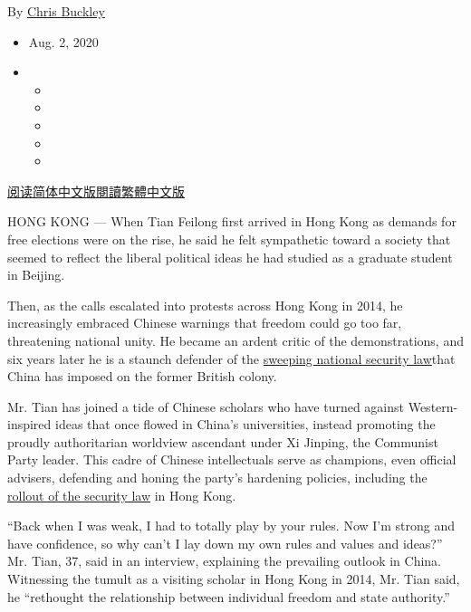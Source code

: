 By \href{https://www.nytimes3xbfgragh.onion/by/chris-buckley}{Chris
Buckley}

\begin{itemize}
\item
  Aug. 2, 2020
\item
  \begin{itemize}
  \item
  \item
  \item
  \item
  \item
  \end{itemize}
\end{itemize}

\href{https://cn.nytimes3xbfgragh.onion/china/20200803/china-hong-kong-national-security-law/}{阅读简体中文版}\href{https://cn.nytimes3xbfgragh.onion/china/20200803/china-hong-kong-national-security-law/zh-hant/}{閱讀繁體中文版}

HONG KONG --- When Tian Feilong first arrived in Hong Kong as demands
for free elections were on the rise, he said he felt sympathetic toward
a society that seemed to reflect the liberal political ideas he had
studied as a graduate student in Beijing.

Then, as the calls escalated into protests across Hong Kong in 2014, he
increasingly embraced Chinese warnings that freedom could go too far,
threatening national unity. He became an ardent critic of the
demonstrations, and six years later he is a staunch defender of the
\href{https://www.nytimes3xbfgragh.onion/2020/06/30/world/asia/china-critics-security-law-hong-kong.html}{sweeping
national security law}that China has imposed on the former British
colony.

Mr. Tian has joined a tide of Chinese scholars who have turned against
Western-inspired ideas that once flowed in China's universities, instead
promoting the proudly authoritarian worldview ascendant under Xi
Jinping, the Communist Party leader. This cadre of Chinese intellectuals
serve as champions, even official advisers, defending and honing the
party's hardening policies, including the
\href{https://www.nytimes3xbfgragh.onion/2020/07/01/world/asia/hong-kong-security-law-china.html}{rollout
of the security law} in Hong Kong.

``Back when I was weak, I had to totally play by your rules. Now I'm
strong and have confidence, so why can't I lay down my own rules and
values and ideas?'' Mr. Tian, 37, said in an interview, explaining the
prevailing outlook in China. Witnessing the tumult as a visiting scholar
in Hong Kong in 2014, Mr. Tian said, he ``rethought the relationship
between individual freedom and state authority.''

